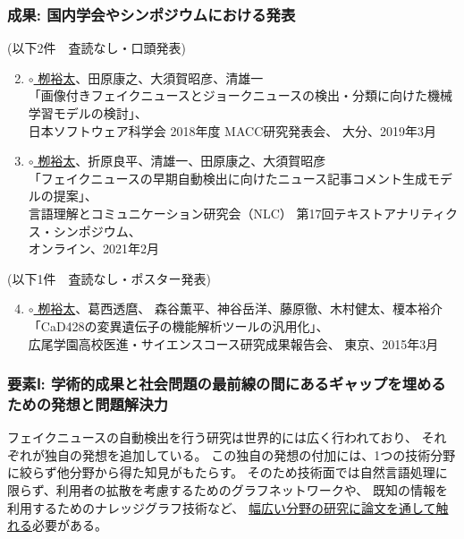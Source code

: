 \subsubsection*{成果: 国内学会やシンポジウムにおける発表}
(以下2件　査読なし・口頭発表)
\begin{enumerate}
    \setcounter{enumi}{1}
    \item \underline{$\circ$ 栁裕太}、田原康之、大須賀昭彦、清雄一\\
        「画像付きフェイクニュースとジョークニュースの検出・分類に向けた機械学習モデルの検討」、\\
        日本ソフトウェア科学会 2018年度 MACC研究発表会、
        大分、2019年3月
    \item \underline{$\circ$ 栁裕太}、折原良平、清雄一、田原康之、大須賀昭彦\\
        「フェイクニュースの早期自動検出に向けたニュース記事コメント生成モデルの提案」、\\
        言語理解とコミュニケーション研究会（NLC） 第17回テキストアナリティクス・シンポジウム、\\
        オンライン、2021年2月
\end{enumerate}
(以下1件　査読なし・ポスター発表)
\begin{enumerate}
    \setcounter{enumi}{3}
    \item \underline{$\circ$ 栁裕太}、葛西透麿、 森谷薫平、神谷岳洋、藤原徹、木村健太、榎本裕介\\
        「CaD428の変異遺伝子の機能解析ツールの汎用化」、\\
        広尾学園高校医進・サイエンスコース研究成果報告会、
        東京、2015年3月
\end{enumerate}

\vspace{5mm}
\noindent
{}
\vspace{-5mm}
\subsubsection*{要素Ⅰ: 学術的成果と社会問題の最前線の間にあるギャップを埋めるための発想と問題解決力}
フェイクニュースの自動検出を行う研究は世界的には広く行われており、
それぞれが独自の発想を追加している。
この独自の発想の付加には、1つの技術分野に絞らず他分野から得た知見がもたらす。
そのため技術面では自然言語処理に限らず、利用者の拡散を考慮するためのグラフネットワークや、
既知の情報を利用するためのナレッジグラフ技術など、
\underline{幅広い分野の研究に論文を通して触れる}必要がある。

